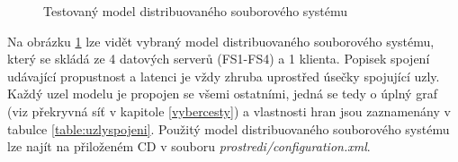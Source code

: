 \documentclass[czech,DP]{thesiskiv}
\begin{document}
\begin{figure}
\centering
\caption{Testovaný model distribuovaného souborového systému}
\label{fig:test_model}
\end{figure}

Na obrázku \ref{fig:test_model} lze vidět vybraný model distribuovaného souborového systému, který se skládá ze 4 datových serverů (FS1-FS4) a 1 klienta. Popisek spojení udávající propustnost a latenci je vždy zhruba uprostřed úsečky spojující uzly. Každý uzel modelu je propojen se všemi ostatními, jedná se tedy o úplný graf (viz překryvná síť v kapitole \ref{vybercesty}) a vlastnosti hran jsou zaznamenány v tabulce \ref{table:uzlyspojeni}. Použitý model distribuovaného souborového systému lze najít na přiloženém CD v souboru \textit{prostredi/configuration.xml}.
\end{document}

